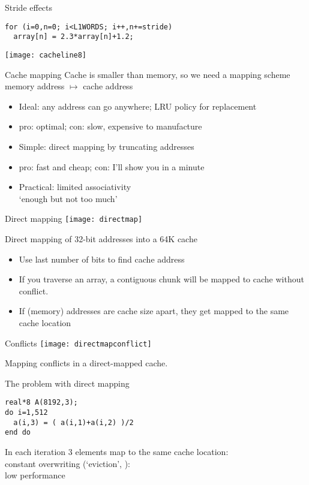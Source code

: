 \begin{numberedframe}{Stride effects}
\small
\begin{verbatim}
for (i=0,n=0; i<L1WORDS; i++,n+=stride)
  array[n] = 2.3*array[n]+1.2;
\end{verbatim}
  \texttt{[image: cacheline8]}
\end{numberedframe}

\begin{numberedframe}{Cache mapping}
  Cache is smaller than memory, so we need a mapping scheme\\
  memory address $\mapsto$ cache address
  \begin{itemize}
  \item Ideal: any address can go anywhere; LRU policy for replacement
  \item pro: optimal; con: slow, expensive to manufacture
  \item Simple: direct mapping by truncating addresses
  \item pro: fast and cheap; con: I'll show you in a minute
  \item Practical: limited associativity\\
    `enough but not too much'
  \end{itemize}
\end{numberedframe}

\begin{numberedframe}{Direct mapping}
  \texttt{[image: directmap]}

Direct mapping of 32-bit addresses into a 64K cache
\begin{itemize}
\item Use last number of bits to find cache address
\item If you traverse an array, a contiguous chunk will be mapped
  to cache without conflict.
\item If (memory) addresses are cache size apart, they get mapped
  to the same cache location
\end{itemize}
\end{numberedframe}

\begin{numberedframe}{Conflicts}
  \texttt{[image: directmapconflict]}  

  Mapping conflicts in a direct-mapped cache.
\end{numberedframe}

\begin{numberedframe}{The problem with direct mapping}
\begin{verbatim}
real*8 A(8192,3);
do i=1,512
  a(i,3) = ( a(i,1)+a(i,2) )/2
end do
\end{verbatim}
In each iteration 3 elements map to the same cache location:\\
constant overwriting (`eviction', ):\\
low performance
\end{numberedframe}

